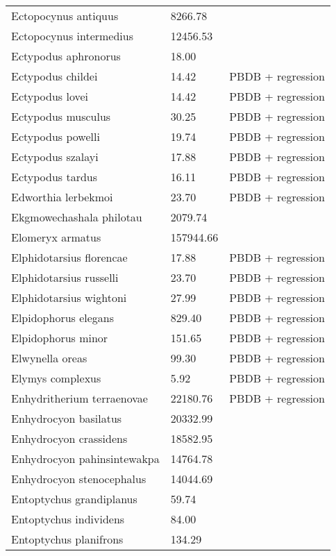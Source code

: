 \begin{center}
\begin{longtable}{p{} p{} p{} }
  Ectopocynus antiquus & 8266.78 & \cite{Tomiya2013} \\ 
  Ectopocynus intermedius & 12456.53 & \cite{Tomiya2013} \\ 
  Ectypodus aphronorus & 18.00 & \cite{Wilson2012} \\ 
  Ectypodus childei & 14.42 & PBDB + regression \\ 
  Ectypodus lovei & 14.42 & PBDB + regression \\ 
  Ectypodus musculus & 30.25 & PBDB + regression \\ 
  Ectypodus powelli & 19.74 & PBDB + regression \\ 
  Ectypodus szalayi & 17.88 & PBDB + regression \\ 
  Ectypodus tardus & 16.11 & PBDB + regression \\ 
  Edworthia lerbekmoi & 23.70 & PBDB + regression \\ 
  Ekgmowechashala philotau & 2079.74 & \cite{Tomiya2013} \\ 
  Elomeryx armatus & 157944.66 & \cite{Tomiya2013} \\ 
  Elphidotarsius florencae & 17.88 & PBDB + regression \\ 
  Elphidotarsius russelli & 23.70 & PBDB + regression \\ 
  Elphidotarsius wightoni & 27.99 & PBDB + regression \\ 
  Elpidophorus elegans & 829.40 & PBDB + regression \\ 
  Elpidophorus minor & 151.65 & PBDB + regression \\ 
  Elwynella oreas & 99.30 & PBDB + regression \\ 
  Elymys complexus & 5.92 & PBDB + regression \\ 
  Enhydritherium terraenovae & 22180.76 & PBDB + regression \\ 
  Enhydrocyon basilatus & 20332.99 & \cite{Tomiya2013} \\ 
  Enhydrocyon crassidens & 18582.95 & \cite{Tomiya2013} \\ 
  Enhydrocyon pahinsintewakpa & 14764.78 & \cite{Tomiya2013} \\ 
  Enhydrocyon stenocephalus & 14044.69 & \cite{Tomiya2013} \\ 
  Entoptychus grandiplanus & 59.74 & \cite{Tomiya2013} \\ 
  Entoptychus individens & 84.00 & \cite{McKenna2011} \\ 
  Entoptychus planifrons & 134.29 & \cite{Tomiya2013} \\ 

\end{longtable}
\end{center}
